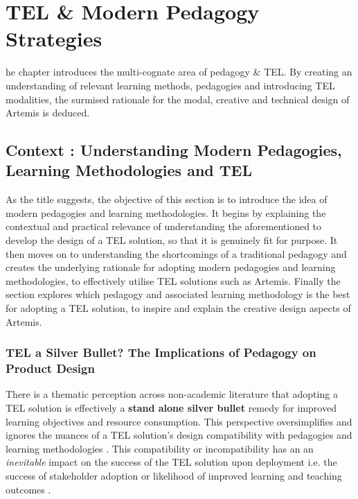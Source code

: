 %
%
\let\textcircled=\pgftextcircled
\chapter{TEL \& Modern Pedagogy Strategies}
\label{chap:TEL and Modern Pedagogical Strategies}


he chapter introduces the multi-cognate area of pedagogy \& TEL. By creating an understanding of relevant learning methods, pedagogies and introducing TEL modalities, the surmised rationale for the modal, creative and technical design of Artemis is deduced.

\section{Context : Understanding Modern Pedagogies, Learning Methodologies and TEL}

As the title suggests, the objective of this section is to introduce the idea of modern pedagogies and learning methodologies. It begins by explaining the contextual  and practical relevance of understanding the aforementioned to develop the design of a TEL solution, so that it is genuinely fit for purpose. It then moves on to understanding the shortcomings of  a traditional pedagogy and creates the underlying rationale for adopting modern pedagogies and learning methodologies, to effectively utilise TEL solutions such as Artemis. Finally the section explores which pedagogy and associated learning methodology is the best for adopting a TEL solution, to inspire and explain the creative design aspects of Artemis.

\label{sec:sec01}
\subsection{TEL a Silver Bullet? The Implications of Pedagogy on Product Design}
\label{subsec:subsec01}

There is a thematic perception across non-academic literature that adopting a TEL solution is effectively a \textbf{stand alone silver bullet} remedy for improved learning objectives and resource consumption. This perspective oversimplifies and ignores the nuances of a TEL solution's design compatibility with pedagogies and learning methodologies \cite{RickReis,Means2009,Team2008,Gordon2014,Burge2011}. This compatibility or incompatibility has an an \textit{inevitable} impact on the success of the TEL solution upon deployment i.e. the success of stakeholder adoption \cite{Mahamuni2015} or likelihood of improved learning and teaching outcomes \cite{RickReis,Means2009,Team2008}.

